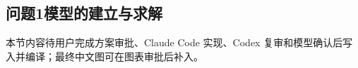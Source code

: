 \subsection{问题1模型的建立与求解}\label{sub:5.1}

本节内容待用户完成方案审批、Claude Code 实现、Codex 复审和模型确认后写入并编译；最终中文图可在图表审批后补入。
